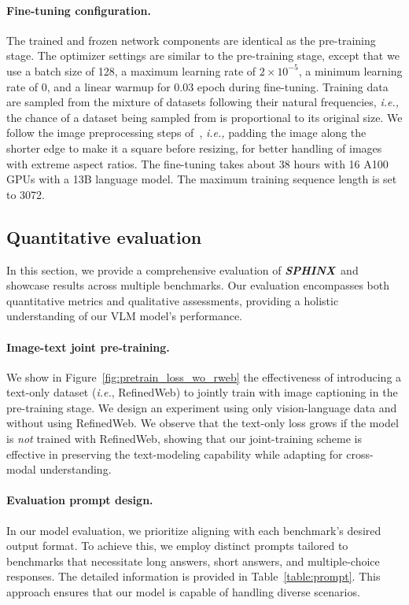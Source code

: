 \documentclass{article} \usepackage{iclr2024_conference,times}
\newcommand{\sphinx}{\textcolor{Goldenrod3}{\textbf{\textit{SPHINX}}}~}
\newcommand{\ie}{{\it i.e.}}
\begin{document}
\paragraph{Fine-tuning configuration.}
The trained and frozen network components are identical as the pre-training stage. The optimizer settings are similar to the pre-training stage, except that
we use a batch size of 128, a maximum learning rate of $2 \times 10^{-5}$, a minimum learning rate of 0, and a linear warmup for $0.03$ epoch during fine-tuning.
Training data are sampled from the mixture of datasets following their natural frequencies, {\it i.e.,} the chance of a dataset being sampled from is proportional to its original size.
We follow the image preprocessing steps of~\citep{chen2023shikra,Liu2023ImprovedBW}, {\it i.e.,} padding the image along the shorter edge to make it a square before resizing, for better handling of images with extreme aspect ratios. The fine-tuning takes about 38 hours with 16 A100 GPUs with a 13B language model. The maximum training sequence length is set to 3072.

\subsection{Quantitative evaluation}
In this section, we provide a comprehensive evaluation of \sphinx and showcase results across multiple benchmarks. Our evaluation encompasses both quantitative metrics and qualitative assessments, providing a holistic understanding of our VLM model's performance.

\paragraph{Image-text joint pre-training.} We show in Figure~\ref{fig:pretrain_loss_wo_rweb} the effectiveness of introducing a text-only dataset (\ie, RefinedWeb) to jointly train with image captioning in the pre-training stage. We design an experiment using only vision-language data and without using RefinedWeb. We observe that the text-only loss grows if the model is {\it not} trained with RefinedWeb, showing that our joint-training scheme is effective in preserving the text-modeling capability while adapting for cross-modal understanding.



\paragraph{Evaluation prompt design.}
In our model evaluation, we prioritize aligning with each benchmark's desired output format. To achieve this, we employ distinct prompts tailored to benchmarks that necessitate long answers, short answers, and multiple-choice responses. The detailed information is provided in Table~\ref{table:prompt}. This approach ensures that our model is capable of handling diverse scenarios. 
\end{document}
